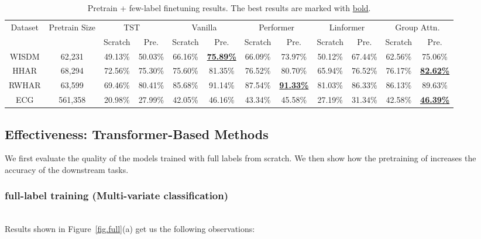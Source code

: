\begin{table}[t]
\vspace{-2mm}
\centering
\footnotesize
\begin{tabular}{cc|cc|cc|cc|cc|cc}
\toprule
\multirow{2}{*}{Dataset} &  \multirow{2}{*}{Pretrain Size} &
\multicolumn{2}{c}{TST~\cite{DBLP:conf/kdd/ZerveasJPBE21}}& \multicolumn{2}{c}{Vanilla} & \multicolumn{2}{c}{Performer} & \multicolumn{2}{c}{Linformer} & \multicolumn{2}{c}{Group Attn.}\\
 \cline{3-12}
 &   &  Scratch & Pre. & Scratch & Pre. & Scratch & Pre. & Scratch & Pre. & Scratch & Pre.\\
 \hline
 WISDM & 62,231 & 49.13\% & 50.03\% & 66.16\% & \underline{\textbf{75.89\%}} & 66.09\% & 73.97\% & 50.12\% & 67.44\% & 62.56\% & 75.06\%  \\
 HHAR & 68,294 & 72.56\% & 75.30\% & 75.60\% & 81.35\% & 76.52\% & 80.70\% & 65.94\% & 76.52\% & 76.17\% & \underline{\textbf{82.62\%}}\\
 RWHAR & 63,599 & 69.46\% & 80.41\% & 85.68\% & 91.14\% & 87.54\% & \underline{\textbf{91.33\%}} & 81.03\% & 86.33\% & 86.13\% & 89.63\%\\
 ECG  & 561,358 & 20.98\% & 27.99\% & 42.05\% & 46.16\% & 43.34\% & 45.58\% & 27.19\% & 31.34\% & 42.58\% & \underline{\textbf{46.39\%}} \\
 \bottomrule
\end{tabular}
\caption{Pretrain + few-label finetuning results. The best results are marked with \underline{bold}.}
\label{tab.pretrain}
\vspace{-5mm}
\end{table}

\subsection{Effectiveness: Transformer-Based Methods}
\label{sec.exp.effective}
We first evaluate the quality of the models trained with full labels from scratch. We then show how the pretraining of \system increases the accuracy of the downstream tasks. 

\subsubsection{full-label training (Multi-variate classification) \nopunct}\ \\
Results shown in Figure~\ref{fig.full}(a) get us the following observations: 

